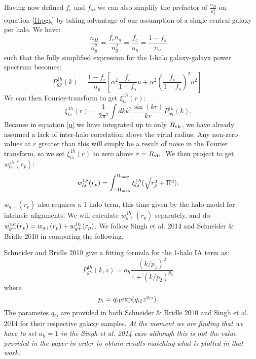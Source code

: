 \documentclass[onecolumn,amsmath,aps,fleqn, superscriptaddress]{revtex4}
\begin{document}
Having now defined $f_c$ and $f_s$, we can also simplify the prefactor of $\frac{n_H}{n_g^2}$ on equation \ref{1hpgg} by taking advantage of our assumption of a single central galaxy per halo. We have:
\begin{equation}
\frac{n_H}{n_g^2} = \frac{f_c n_g}{n_g^2} = \frac{f_c}{n_g} = \frac{1- f_s}{n_g}
\label{prefac1hpgg}
\end{equation}
such that the fully simplified expression for the 1-halo galaxy-galayx power spectrum becomes:
\begin{equation}
P_{gg}^{1h}(k) = \frac{1-f_s}{n_g}\left[\alpha^2 \frac{f_s}{1-f_s} u + \alpha^2 \left(\frac{f_s}{1-f_s}\right)^2 u^2\right].
\label{1hpgg_fs}
\end{equation}
We can then Fourier-transform to get $\xi^{1h}_{ls}(r)$:
\begin{equation}
\xi_{ls}^{1h}(r) = \frac{1}{2\pi^2} \int dk k^2 \frac{\sin(kr)}{kr} P_{gg}^{1h}(k).
\label{xils1h}
\end{equation}
Because in equation \ref{u} we have integrated up to only $R_{\rm vir}$, we have already assumed a lack of inter-halo correlation above the virial radius. Any non-zero values at $r$ greater than this will simply be a result of noise in the Fourier transform, so we set $\xi_{ls}^{1h}(r)$ to zero above $r= R_{\rm vir}$. We then project to get $w_{ls}^{1h}(r_p)$:
\begin{equation}
w_{ls}^{1h}(r_p) = \int_{-\Pi_{\rm max}}^{\Pi_{\rm max}} \xi_{ls}^{1h}(\sqrt{r_p^2 + \Pi^2}).
\label{wl1h}
\end{equation}

$w_{g+}(r_p)$ also requires a 1-halo term, this time given by the halo model for intrinsic alignments. We will calculate $w_{g+}^{1h}(r_p)$ separately, and do $w_{g+}^{\rm tot}(r_p) = w_{g+}(r_p) + w_{g+}^{1h}(r_p)$. We follow Singh et al. 2014 and Schneider \& Bridle 2010 in computing the following.

Schneider and Bridle 2010 give a fitting formula for the 1-halo IA term as:
\begin{equation}
P^{1h}_{g\gamma}(k,z) = a_h \frac{(k/p_1)^2}{1+ (k/p_2)^{p_3}}
\label{P1hIA}
\end{equation}
where
\begin{equation}
p_i = q_{i1} {\rm exp}(q_{i2} z^{q_{i3}}).
\label{pi}
\end{equation}
The parametes $q_{ij}$ are provided in both Schneider \& Bridle 2010 and Singh et al. 2014 for their respective galaxy samples. {\it At the moment we are finding that we have to set $a_h=1$ in the Singh et al. 2014 case although this is not the value provided in the paper in order to obtain results matching what is plotted in that work.}
\end{document}
